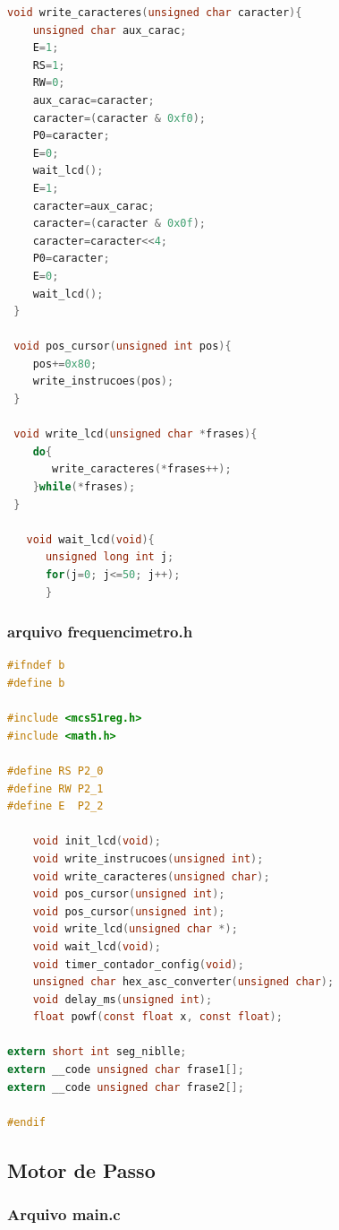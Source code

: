 \documentclass{Fabiano_file}
\begin{document}
{\begin{lstlisting}[language=C]
 void write_caracteres(unsigned char caracter){
    unsigned char aux_carac;
    E=1;
    RS=1;
    RW=0;
    aux_carac=caracter;
    caracter=(caracter & 0xf0);
    P0=caracter;
    E=0;
    wait_lcd();
    E=1;
    caracter=aux_carac;
    caracter=(caracter & 0x0f);
    caracter=caracter<<4;
    P0=caracter;
    E=0;
    wait_lcd();
 }
 
 void pos_cursor(unsigned int pos){
    pos+=0x80;
    write_instrucoes(pos);
 }
 
 void write_lcd(unsigned char *frases){
    do{
       write_caracteres(*frases++);
    }while(*frases);
 }
    
   void wait_lcd(void){
      unsigned long int j;
      for(j=0; j<=50; j++);
      }
\end{lstlisting}

\subsubsection{arquivo frequencimetro.h}

\begin{lstlisting}[language=C]    
    #ifndef b
#define b

#include <mcs51reg.h>
#include <math.h>

#define RS P2_0
#define RW P2_1
#define E  P2_2
 
    void init_lcd(void);
    void write_instrucoes(unsigned int);
    void write_caracteres(unsigned char);
    void pos_cursor(unsigned int);
    void pos_cursor(unsigned int);
    void write_lcd(unsigned char *);
    void wait_lcd(void);
    void timer_contador_config(void);
    unsigned char hex_asc_converter(unsigned char);
    void delay_ms(unsigned int);
    float powf(const float x, const float);

extern short int seg_niblle;
extern __code unsigned char frase1[];
extern __code unsigned char frase2[];

#endif
\end{lstlisting}

\newpage

\subsection{Motor de Passo}

\subsubsection{Arquivo main.c}

}
\end{document}
